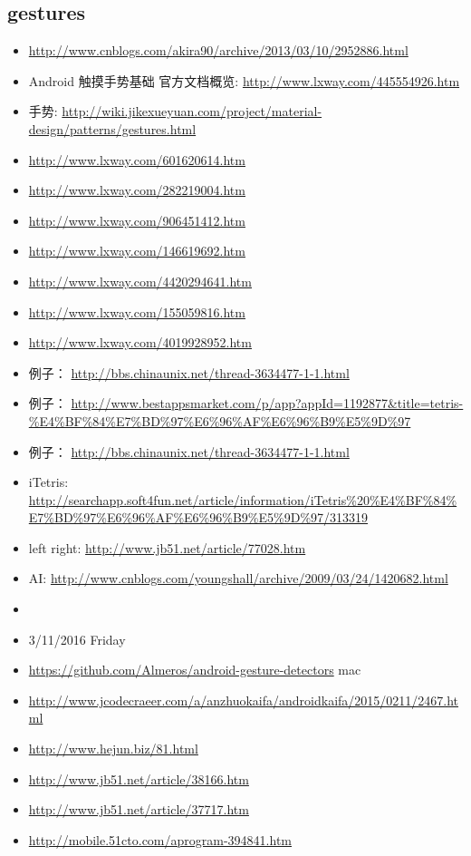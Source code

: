 \documentclass[9pt,b5paper]{article}
\begin{document}
\subsection{gestures}
\label{sec-3-5}
\begin{itemize}
\item \url{http://www.cnblogs.com/akira90/archive/2013/03/10/2952886.html}
\item Android 触摸手势基础 官方文档概览: \url{http://www.lxway.com/445554926.htm}
\item 手势: \url{http://wiki.jikexueyuan.com/project/material-design/patterns/gestures.html}
\item \url{http://www.lxway.com/601620614.htm}
\item \url{http://www.lxway.com/282219004.htm}
\item \url{http://www.lxway.com/906451412.htm}
\item \url{http://www.lxway.com/146619692.htm}
\item \url{http://www.lxway.com/4420294641.htm}
\item \url{http://www.lxway.com/155059816.htm}
\item \url{http://www.lxway.com/4019928952.htm}
\item 例子： \url{http://bbs.chinaunix.net/thread-3634477-1-1.html}
\item 例子： \url{http://www.bestappsmarket.com/p/app?appId=1192877&title=tetris-\%E4\%BF\%84\%E7\%BD\%97\%E6\%96\%AF\%E6\%96\%B9\%E5\%9D\%97}
\item 例子： \url{http://bbs.chinaunix.net/thread-3634477-1-1.html}

\item iTetris: \url{http://searchapp.soft4fun.net/article/information/iTetris\%20\%E4\%BF\%84\%E7\%BD\%97\%E6\%96\%AF\%E6\%96\%B9\%E5\%9D\%97/313319}
\item left right: \url{http://www.jb51.net/article/77028.htm}
\item AI: \url{http://www.cnblogs.com/youngshall/archive/2009/03/24/1420682.html}
\item 
\item 3/11/2016 Friday
\item \url{https://github.com/Almeros/android-gesture-detectors} mac
\item \url{http://www.jcodecraeer.com/a/anzhuokaifa/androidkaifa/2015/0211/2467.html}
\item \url{http://www.hejun.biz/81.html}
\item \url{http://www.jb51.net/article/38166.htm}
\item \url{http://www.jb51.net/article/37717.htm}
\item \url{http://mobile.51cto.com/aprogram-394841.htm}


\end{itemize}
\end{document}
